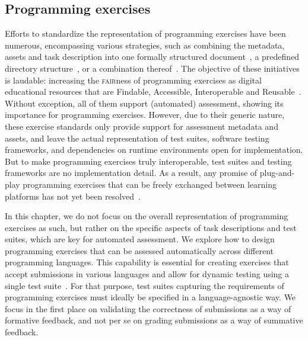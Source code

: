 \documentclass[../main]{subfiles}
\begin{document}
\subsection{Programming exercises}\label{subsec:dsl-programming-exercises}

Efforts to standardize the representation of programming exercises have been numerous, encompassing various strategies, such as combining the metadata, assets and task description into one formally structured document~\autocite{mishraProgrammingExerciseMarkup2023,paivaAnotherProgrammingExercises2020,queirosPexilProgrammingExercises2011,swachaSIPEDomainspecificLanguage2018,queirosProgrammingExercisesEvaluation2012a}, a predefined directory structure~\autocite{verhoeffProgrammingTaskPackages2008}, or a combination thereof~\autocite{edwardsDevelopingCommonFormat2008a,strickrothProFormAXMLbasedExchange2015}.
The objective of these initiatives is laudable: increasing the \textsc{fair}ness of programming exercises as digital educational resources that are Findable, Accessible, Interoperable and Reusable~\autocite{wilkinsonFAIRGuidingPrinciples2016}.
Without exception, all of them support (automated) assessment, showing its importance for programming exercises.
However, due to their generic nature, these exercise standards only provide support for assessment metadata and assets, and leave the actual representation of test suites, software testing frameworks, and dependencies on runtime environments open for implementation.
But to make programming exercises truly interoperable, test suites and testing frameworks are no implementation detail.
As a result, any promise of plug-and-play programming exercises that can be freely exchanged between learning platforms has not yet been resolved~\autocite{ala-mutkaSurveyAutomatedAssessment2005,ihantolaReviewRecentSystems2010,messerAutomatedGradingFeedback2024,paivaAutomatedAssessmentComputer2022}.

In this chapter, we do not focus on the overall representation of programming exercises as such, but rather on the specific aspects of task descriptions and test suites, which are key for automated assessment.
We explore how to design programming exercises that can be assessed automatically across different programming languages.
This capability is essential for creating exercises that accept submissions in various languages and allow for dynamic testing using a single test suite~\autocite{staubitzPracticalProgrammingExercises2015}.
For that purpose, test suites capturing the requirements of programming exercises must ideally be specified in a language-agnostic way.
We focus in the first place on validating the correctness of submissions as a way of formative feedback, and not per se on grading submissions as a way of summative feedback.
\end{document}
